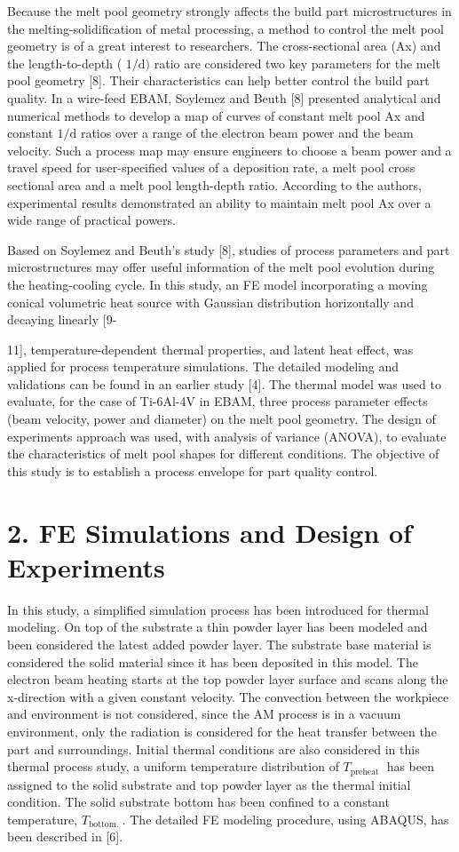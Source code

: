 \documentclass[10pt]{article}
\begin{document}
Because the melt pool geometry strongly affects the build part microstructures in the melting-solidification of metal processing, a method to control the melt pool geometry is of a great interest to researchers. The cross-sectional area (Ax) and the length-to-depth ( $1 / \mathrm{d})$ ratio are considered two key parameters for the melt pool geometry [8]. Their characteristics can help better control the build part quality. In a wire-feed EBAM, Soylemez and Beuth [8] presented analytical and numerical methods to develop a map of curves of constant melt pool Ax and constant $1 / \mathrm{d}$ ratios over a range of the electron beam power and the beam velocity. Such a process map may ensure engineers to choose a beam power and a travel speed for user-specified values of a deposition rate, a melt pool cross sectional area and a melt pool length-depth ratio. According to the authors, experimental results demonstrated an ability to maintain melt pool Ax over a wide range of practical powers.

Based on Soylemez and Beuth's study [8], studies of process parameters and part microstructures may offer useful information of the melt pool evolution during the heating-cooling cycle. In this study, an FE model incorporating a moving conical volumetric heat source with Gaussian distribution horizontally and decaying linearly [9-

11], temperature-dependent thermal properties, and latent heat effect, was applied for process temperature simulations. The detailed modeling and validations can be found in an earlier study [4]. The thermal model was used to evaluate, for the case of Ti-6Al-4V in EBAM, three process parameter effects (beam velocity, power and diameter) on the melt pool geometry. The design of experiments approach was used, with analysis of variance (ANOVA), to evaluate the characteristics of melt pool shapes for different conditions. The objective of this study is to establish a process envelope for part quality control.

\section*{2. FE Simulations and Design of Experiments}
In this study, a simplified simulation process has been introduced for thermal modeling. On top of the substrate a thin powder layer has been modeled and been considered the latest added powder layer. The substrate base material is considered the solid material since it has been deposited in this model. The electron beam heating starts at the top powder layer surface and scans along the x-direction with a given constant velocity. The convection between the workpiece and environment is not considered, since the AM process is in a vacuum environment, only the radiation is considered for the heat transfer between the part and surroundings. Initial thermal conditions are also considered in this thermal process study, a uniform temperature distribution of $T_{\text {preheat }}$ has been assigned to the solid substrate and top powder layer as the thermal initial condition. The solid substrate bottom has been confined to a constant temperature, $T_{\text {bottom. }}$. The detailed FE modeling procedure, using ABAQUS, has been described in [6].
\end{document}
